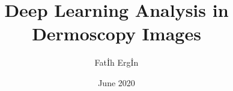 
%

%


%
%
\author{Fatİh Ergİn}
\title{Deep Learning Analysis in Dermoscopy Images}
%
%
\date{June 2020}
%

%

%

%

%

\setlength{\jot}{20pt}
\usepackage[pdftex]{hyperref}
\usepackage[all]{hypcap}

\addtolength{\textheight}{1.5cm}
\newlength\myindent
\setlength\myindent{6em}
\newcommand\bindent{%
  \begingroup
  \setlength{\itemindent}{\myindent}
  \addtolength{\algorithmicindent}{\myindent}
}
\newcommand\eindent{\endgroup}


%
%
%

%
%

%

%

%

%

%

%

%
%







